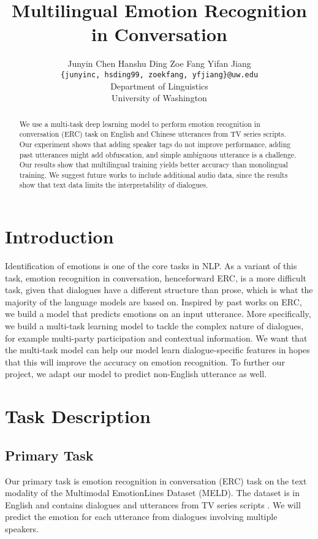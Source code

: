 \documentclass[11pt]{article}
\title{Multilingual Emotion Recognition in Conversation}
\author{Junyin Chen {} {} {} Hanshu Ding {} {} {} Zoe Fang {} {} {} Yifan Jiang \\
		\texttt{\{junyinc, hsding99, zoekfang, yfjiang\}@uw.edu} \\
        Department of Linguistics \\ University of Washington}
\begin{document}
\maketitle
\begin{abstract}
  We use a multi-task deep learning model to perform emotion recognition in conversation (ERC) task on English and Chinese utterances from TV series scripts. Our experiment shows that adding speaker tags do not improve performance, adding past utterances might add obfuscation, and simple ambiguous utterance is a challenge. Our results show that multilingual training yields better accuracy than monolingual training. We suggest future works to include additional audio data, since the results show that text data limits the interpretability of dialogues.

\end{abstract}

\section{Introduction}
Identification of emotions is one of the core tasks in NLP. As a variant of this task, emotion recognition in conversation, henceforward ERC, is a more difficult task, given that dialogues have a different structure than prose, which is what the majority of the language models are based on. Inspired by past works on ERC, we build a model that predicts emotions on an input utterance. More specifically, we build a multi-task learning model to tackle the complex nature of dialogues, for example multi-party participation and contextual information. We want that the multi-task model can help our model learn dialogue-specific features in hopes that this will improve the accuracy on emotion recognition. To further our project, we adapt our model to predict non-English utterance as well. 

\section{Task Description}

\subsection{Primary Task}
\label{sect:primary_task}

Our primary task is emotion recognition in conversation (ERC) task on the text modality of the Multimodal EmotionLines Dataset (MELD). The dataset is in English and contains dialogues and utterances from TV series scripts . We will predict the emotion for each utterance from dialogues involving multiple speakers.
\end{document}
